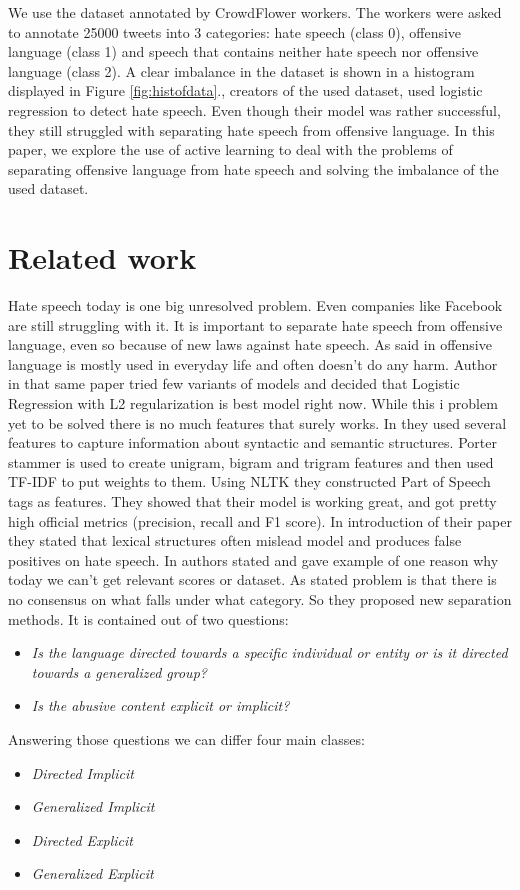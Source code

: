 \documentclass[10pt, a4paper]{article}
\begin{document}
We use the dataset annotated by CrowdFlower workers. The workers were asked to annotate 25000 tweets into 3 categories: hate speech (class 0), offensive language (class 1) and speech that contains neither hate speech nor offensive language (class 2). A clear imbalance in the dataset is shown in a histogram displayed in Figure \ref{fig:histofdata}.\cite{Davidson2017AutomatedHS}, creators of the used dataset, used logistic regression to detect hate speech. Even though their model was rather successful, they still struggled with separating hate speech from offensive language. In this paper, we explore the use of active learning to deal with the problems of separating offensive language from hate speech and solving the imbalance of the used dataset.


\section{Related work}

Hate speech today is one big unresolved problem. Even companies like Facebook are still struggling with it. It is important to separate hate speech from offensive language, even so because of new laws against hate speech\cite{Davidson2017AutomatedHS}. As said in \cite{Davidson2017AutomatedHS} offensive language is mostly used in everyday life and often doesn't do any harm. Author in that same paper tried few variants of models and decided that Logistic Regression with L2 regularization is best model right now.
While this i problem yet to be solved there is no much features that surely works. In \cite{Davidson2017AutomatedHS} they used several features to capture information about syntactic and semantic structures. Porter stammer is used to create unigram, bigram and trigram features and then used TF-IDF to put weights to them. Using NLTK they constructed Part of Speech tags as features. They showed that their model is working great, and got pretty high official metrics (precision, recall and F1 score). In introduction of their paper they stated that lexical structures often mislead model and produces false positives on hate speech.
In \cite{WaseemUnderstandingAbuse} authors stated and gave example of one reason why today we can't get relevant scores or dataset. As stated problem is that there is no consensus on what falls under what category. So they proposed new separation methods. It is contained out of two questions:
\begin{itemize}
	\item \textit{Is the language directed towards a specific individual or entity or is it directed towards a generalized group?}
	\item \textit{Is the abusive content explicit or implicit?}
\end{itemize}
Answering those questions we can differ four main classes:
\begin{itemize}
	\item \textit{Directed Implicit}
	\item \textit{Generalized Implicit}
	\item \textit{Directed Explicit}
	\item \textit{Generalized Explicit}
\end{itemize}
\end{document}

